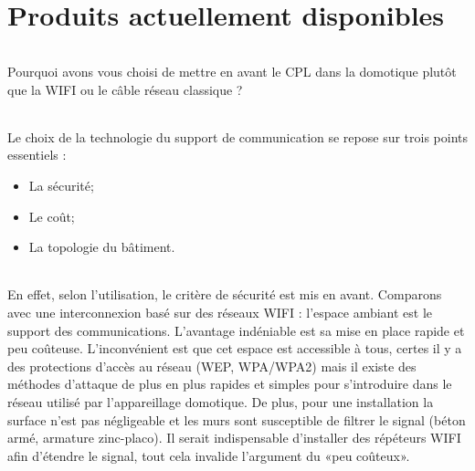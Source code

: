     \clearpage

\part{Produits actuellement disponibles}
    \paragraph{}
Pourquoi avons vous choisi de mettre en avant le CPL dans la domotique plutôt que la WIFI ou le câble réseau classique ?
    \paragraph{}
Le choix de la technologie du support de communication se repose sur trois points essentiels :
        \begin{itemize}
            \item La sécurité;
            \item Le coût;
            \item La topologie du bâtiment.
        \end{itemize}
    \paragraph{}
En effet, selon l’utilisation, le critère de sécurité est mis en avant.
Comparons avec une interconnexion basé sur des réseaux WIFI : l’espace ambiant est le support des communications.
L’avantage indéniable est sa mise en place rapide et peu coûteuse.
L’inconvénient est que cet espace est accessible à tous, certes il y a des protections d'accès au réseau (WEP, WPA/WPA2)
mais il existe des méthodes d’attaque de plus en plus rapides et simples pour s’introduire dans le réseau utilisé par l’appareillage domotique.
De plus, pour une installation la surface n'est pas négligeable et les murs sont susceptible de filtrer le signal (béton armé, armature zinc-placo).
Il serait indispensable d’installer des répéteurs WIFI afin d’étendre le signal, tout cela invalide l’argument du «peu coûteux».

